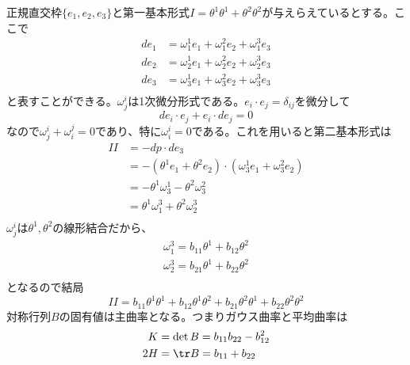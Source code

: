         正規直交枠$\{e_1, e_2, e_3\}$と第一基本形式$I = \theta^1\theta^1 + \theta^2\theta^2$が与えらえているとする。ここで
        \begin{align*}
            de_1 &= \omega^1_1e_1 + \omega^2_1e_2 + \omega^3_1e_3\\
            de_2 &= \omega^1_2e_1 + \omega^2_2e_2 + \omega^3_2e_3\\
            de_3 &= \omega^1_3e_1 + \omega^2_3e_2 + \omega^3_3e_3\\
        \end{align*}
        と表すことができる。$\omega^i_j$は1次微分形式である。$e_i \cdot e_j = \delta_{ij}$を微分して
            \[de_i \cdot e_j + e_i \cdot de_j = 0\]
        なので$\omega^i_j + \omega^j_i = 0$であり、特に$\omega^i_i = 0$である。これを用いると第二基本形式は
        \begin{align*}
            II &= -dp \cdot de_3\\
            &= - (\theta^1e_1 + \theta^2e_2) \cdot (\omega^1_3e_1 + \omega^2_3e_2)\\
            &= - \theta^1\omega^1_3 - \theta^2\omega^2_3\\
            &= \theta^1\omega^3_1 + \theta^2\omega^3_2\\
        \end{align*}
        $\omega^i_j$は$\theta^1, \theta^2$の線形結合だから、
        \begin{align*}
            \omega^3_1 = b_{11}\theta^1 + b_{12}\theta^2\\
            \omega^3_2 = b_{21}\theta^1 + b_{22}\theta^2\\
        \end{align*}
        となるので結局
            \[II = b_{11}\theta^1\theta^1 + b_{12}\theta^1\theta^2 + b_{21}\theta^2\theta^1 + b_{22}\theta^2\theta^2\]
        対称行列$B$の固有値は主曲率となる。つまりガウス曲率と平均曲率は
        \begin{align*}
            K &= \det B = b_{11}b_{22} - b_{12}^2\\
            2H &= \tr B = b_{11} + b_{22}\\
        \end{align*}

